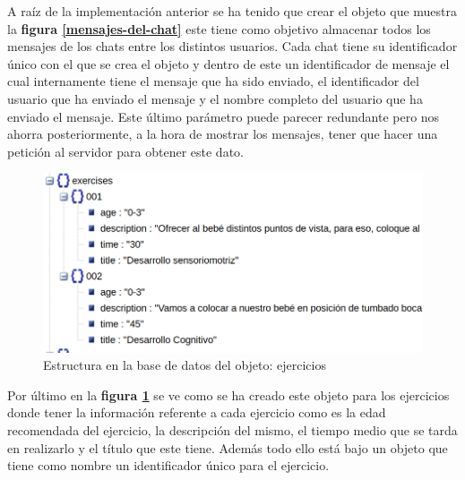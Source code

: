 A raíz de la implementación anterior se ha tenido que crear el objeto
que muestra la \textbf{figura \ref{mensajes-del-chat}} este tiene como
objetivo almacenar todos los mensajes de los chats entre los distintos
usuarios. Cada chat tiene su identificador único con el que se crea el
objeto y dentro de este un identificador de mensaje el cual internamente
tiene el mensaje que ha sido enviado, el identificador del usuario que
ha enviado el mensaje y el nombre completo del usuario que ha enviado
el mensaje. Este último parámetro puede parecer redundante pero nos
ahorra posteriormente, a la hora de mostrar los mensajes, tener que hacer
una petición al servidor para obtener este dato.

\medskip
\begin{figure}
    \includegraphics[width=\linewidth]{./images/exercises-database.png}
    \caption{Estructura en la base de datos del objeto: ejercicios}
    \label{ejercicios}
\end{figure}

Por último en la \textbf{figura \ref{ejercicios}} se ve
como se ha creado este objeto para los ejercicios donde tener la información
referente a cada ejercicio como es la edad recomendada del ejercicio,
la descripción del mismo, el tiempo medio que se tarda en realizarlo y el
título que este tiene. Además todo ello está bajo un objeto que tiene como
nombre un identificador único para el ejercicio.

